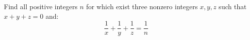 Find all positive integers $n$ for which exist three nonzero integers $x, y, z$ such that $x+y+z=0$ and:\[\frac{1}{x}+\frac{1}{y}+\frac{1}{z}=\frac{1}{n}\]